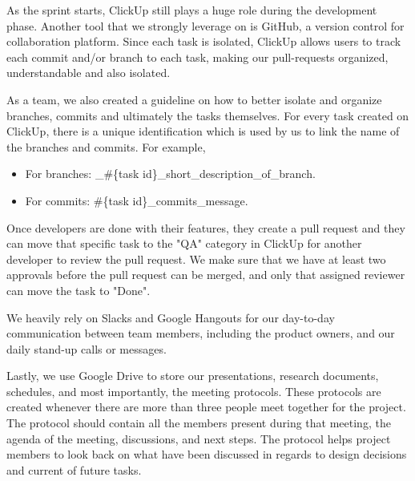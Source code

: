 As the sprint starts, ClickUp still plays a huge role during the development phase. Another tool that we strongly leverage on is GitHub, a version control for collaboration platform. Since each task is isolated, ClickUp allows users to track each commit and/or branch to each task, making our pull-requests organized, understandable and also isolated.

As a team, we also created a guideline on how to better isolate and organize branches, commits and ultimately the tasks themselves. For every task created on ClickUp, there is a unique identification which is used by us to link the name of the branches and commits. For example,

\begin{itemize}
\item For branches: \_\#\{task id\}\_short\_description\_of\_branch.
\item For commits: \#\{task id\}\_commits\_message.
\end{itemize}


Once developers are done with their features, they create a pull request and they can move that specific task to the "QA" category in ClickUp for another developer to review the pull request. We make sure that we have at least two approvals before the pull request can be merged, and only that assigned reviewer can move the task to "Done".

We heavily rely on Slacks and Google Hangouts for our day-to-day communication between team members, including the product owners, and our daily stand-up calls or messages.

Lastly, we use Google Drive to store our presentations, research documents, schedules, and most importantly, the meeting protocols. These protocols are created whenever there are more than three people meet together for the project. The protocol should contain all the members present during that meeting, the agenda of the meeting, discussions, and next steps. The protocol helps project members to look back on what have been discussed in regards to design decisions and current of future tasks.


\newpage
